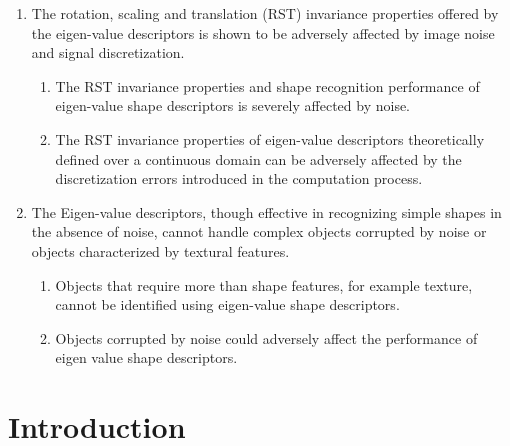 \documentclass {udthesis}
\begin{document}
\begin{enumerate}[label=Section \arabic*:, start=0]
\begin{enumerate}[label=Para \arabic*:, start=1]
    \end{enumerate}

\item The rotation, scaling and translation (RST) invariance properties offered by the eigen-value descriptors is shown to be adversely affected by image noise and signal discretization.

    \begin{enumerate}[label=Para \arabic*:, start=1]

      \item The RST invariance properties and shape recognition performance of eigen-value shape descriptors is severely affected by noise.
      
      \item The RST invariance properties of eigen-value descriptors theoretically defined over a continuous domain can be adversely affected by the discretization errors introduced in the computation process. 
      
    \end{enumerate}

\item The Eigen-value descriptors, though effective in recognizing simple shapes in the absence of noise, cannot handle complex objects corrupted by noise or objects characterized by textural features.

    \begin{enumerate}[label=Para \arabic*:, start=1]

      \item Objects that require more than shape features, for example texture, cannot be identified using eigen-value shape descriptors.
      
      \item Objects corrupted by noise could adversely affect the performance of eigen value shape descriptors.
      
    \end{enumerate}
    
\end{enumerate}


\section{Introduction}
\end{document}
